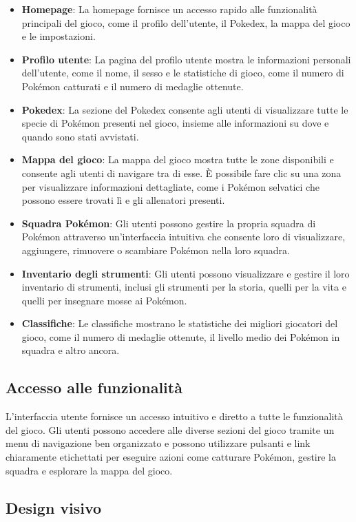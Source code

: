 \documentclass{article}
\begin{document}
\begin{itemize}
\item \textbf{Homepage}: La homepage fornisce un accesso rapido alle funzionalità principali del gioco, come il profilo dell'utente, il Pokedex, la mappa del gioco e le impostazioni.
\item \textbf{Profilo utente}: La pagina del profilo utente mostra le informazioni personali dell'utente, come il nome, il sesso e le statistiche di gioco, come il numero di Pokémon catturati e il numero di medaglie ottenute.
\item \textbf{Pokedex}: La sezione del Pokedex consente agli utenti di visualizzare tutte le specie di Pokémon presenti nel gioco, insieme alle informazioni su dove e quando sono stati avvistati.
\item \textbf{Mappa del gioco}: La mappa del gioco mostra tutte le zone disponibili e consente agli utenti di navigare tra di esse. È possibile fare clic su una zona per visualizzare informazioni dettagliate, come i Pokémon selvatici che possono essere trovati lì e gli allenatori presenti.
\item \textbf{Squadra Pokémon}: Gli utenti possono gestire la propria squadra di Pokémon attraverso un'interfaccia intuitiva che consente loro di visualizzare, aggiungere, rimuovere o scambiare Pokémon nella loro squadra.
\item \textbf{Inventario degli strumenti}: Gli utenti possono visualizzare e gestire il loro inventario di strumenti, inclusi gli strumenti per la storia, quelli per la vita e quelli per insegnare mosse ai Pokémon.
\item \textbf{Classifiche}: Le classifiche mostrano le statistiche dei migliori giocatori del gioco, come il numero di medaglie ottenute, il livello medio dei Pokémon in squadra e altro ancora.
\end{itemize}

\subsection{Accesso alle funzionalità}

L'interfaccia utente fornisce un accesso intuitivo e diretto a tutte le funzionalità del gioco. Gli utenti possono accedere alle diverse sezioni del gioco tramite un menu di navigazione ben organizzato e possono utilizzare pulsanti e link chiaramente etichettati per eseguire azioni come catturare Pokémon, gestire la squadra e esplorare la mappa del gioco.

\subsection{Design visivo}
\end{document}

